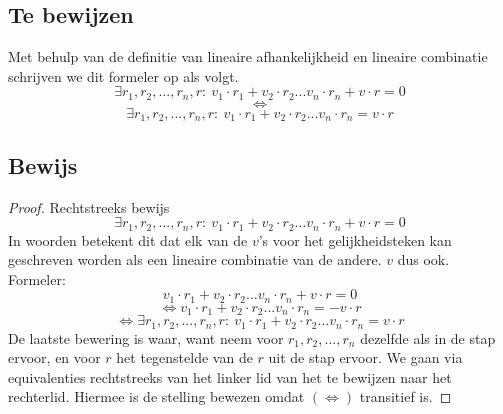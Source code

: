 \documentclass[lineaire_algebra_oplossingen.tex]{subfiles}
\begin{document}
\subsection{Te bewijzen}
Met behulp van de definitie van lineaire afhankelijkheid en lineaire combinatie schrijven we dit formeler op als volgt.
\[
\exists r_1,r_2,...,r_n,r:\ v_1\cdot r_1 + v_2\cdot r_2...v_n \cdot r_n + v \cdot r = 0
\]
\[\Leftrightarrow \]
\[\exists r_1,r_2,...,r_n,r:\ v_1\cdot r_1 + v_2\cdot r_2...v_n \cdot r_n = v \cdot r \]
\subsection{Bewijs}
\begin{proof}
Rechtstreeks bewijs
\[
\exists r_1,r_2,...,r_n,r:\ v_1\cdot r_1 + v_2\cdot r_2...v_n \cdot r_n + v \cdot r = 0
\]
In woorden betekent dit dat elk van de $v$'s voor het gelijkheidsteken kan geschreven worden als een lineaire combinatie van de andere. $v$ dus ook.\\
Formeler:
\[
v_1\cdot r_1 + v_2\cdot r_2...v_n \cdot r_n + v \cdot r = 0
\]
\[
\Leftrightarrow v_1\cdot r_1 + v_2\cdot r_2...v_n \cdot r_n = - v \cdot r 
\]
\[\Leftrightarrow \exists r_1,r_2,...,r_n,r:\ v_1\cdot r_1 + v_2\cdot r_2...v_n \cdot r_n = v \cdot r \]
De laatste bewering is waar, want neem voor $r_1,r_2,...,r_n$ dezelfde als in de stap ervoor, en voor $r$ het tegenstelde van de $r$ uit de stap ervoor.
We gaan via equivalenties rechtstreeks van het linker lid van het te bewijzen naar het rechterlid. Hiermee is de stelling bewezen omdat $(\Leftrightarrow)$ transitief is.
\end{proof}
\end{document}
